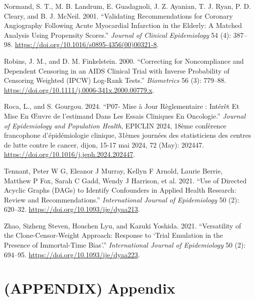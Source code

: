 \documentclass[
]{book}
\newlength{\cslhangindent}
\newenvironment{CSLReferences}[2] %
 {\begin{list}{}{%
  \setlength{\itemindent}{0pt}
  \setlength{\leftmargin}{0pt}
  \setlength{\parsep}{0pt}
  \ifodd #1
   \setlength{\leftmargin}{\cslhangindent}
   \setlength{\itemindent}{-1\cslhangindent}
  \fi
  \setlength{\itemsep}{#2\baselineskip}}}
 {\end{list}}
\begin{document}
\begin{CSLReferences}{1}{0}
Normand, S. T., M. B. Landrum, E. Guadagnoli, J. Z. Ayanian, T. J. Ryan,
P. D. Cleary, and B. J. McNeil. 2001. {``Validating Recommendations for
Coronary Angiography Following Acute Myocardial Infarction in the
Elderly: A Matched Analysis Using Propensity Scores.''} \emph{Journal of
Clinical Epidemiology} 54 (4): 387--98.
\url{https://doi.org/10.1016/s0895-4356(00)00321-8}.

Robins, J. M., and D. M. Finkelstein. 2000. {``Correcting for
Noncompliance and Dependent Censoring in an {AIDS} Clinical Trial with
Inverse Probability of Censoring Weighted ({IPCW}) Log-Rank Tests.''}
\emph{Biometrics} 56 (3): 779--88.
\url{https://doi.org/10.1111/j.0006-341x.2000.00779.x}.

Roca, L., and S. Gourgou. 2024. {``P07- Mise à Jour Règlementaire :
Intérêt Et Mise En Œuvre de l'estimand Dans Les Essais Cliniques En
Oncologie.''} \emph{Journal of Epidemiology and Population Health},
{EPICLIN} 2024, 18ème conférence francophone d'épidémiologie clinique,
31èmes journées des statisticiens des centres de lutte contre le cancer,
dijon, 15-17 mai 2024, 72 (May): 202447.
\url{https://doi.org/10.1016/j.jeph.2024.202447}.

Tennant, Peter W G, Eleanor J Murray, Kellyn F Arnold, Laurie Berrie,
Matthew P Fox, Sarah C Gadd, Wendy J Harrison, et al. 2021. {``Use of
Directed Acyclic Graphs ({DAGs}) to Identify Confounders in Applied
Health Research: Review and Recommendations.''} \emph{International
Journal of Epidemiology} 50 (2): 620--32.
\url{https://doi.org/10.1093/ije/dyaa213}.

Zhao, Sizheng Steven, Houchen Lyu, and Kazuki Yoshida. 2021.
{``Versatility of the Clone-Censor-Weight Approach: Response to {`Trial
Emulation in the Presence of Immortal-Time Bias'}.''}
\emph{International Journal of Epidemiology} 50 (2): 694--95.
\url{https://doi.org/10.1093/ije/dyaa223}.

\end{CSLReferences}

\chapter*{(APPENDIX) Appendix}\label{appendix-appendix}
\end{document}
